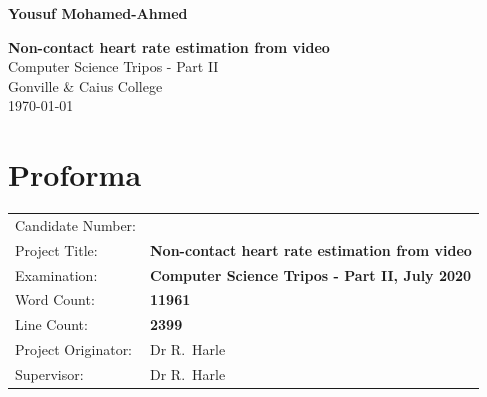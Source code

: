 \documentclass[12pt,twoside,notitlepage]{report}
\begin{document}





\pagestyle{empty}

\hfill{\LARGE \bf Yousuf Mohamed-Ahmed}

\vspace*{60mm}
\begin{center}
\Huge
{\bf Non-contact heart rate estimation from video} \\
\vspace*{5mm}
Computer Science Tripos - Part II  \\
\vspace*{5mm}
Gonville \& Caius College\\
\vspace*{5mm}
\today  %
\end{center}

\cleardoublepage


\setcounter{page}{1}
\pagestyle{plain}

\chapter*{Proforma}

{\large
\begin{tabular}{ll}
Candidate Number:  & \\
Project Title:      & \bf Non-contact heart rate estimation from video \\
Examination:        & \bf Computer Science Tripos - Part II, July 2020    \\
Word Count:         & \bf 11961\footnotemark[1] \\
Line Count: & \bf 2399 \\
Project Originator: & Dr R.~Harle                    \\
Supervisor:         & Dr R.~Harle                    \\ 
\end{tabular}
}
\end{document}
